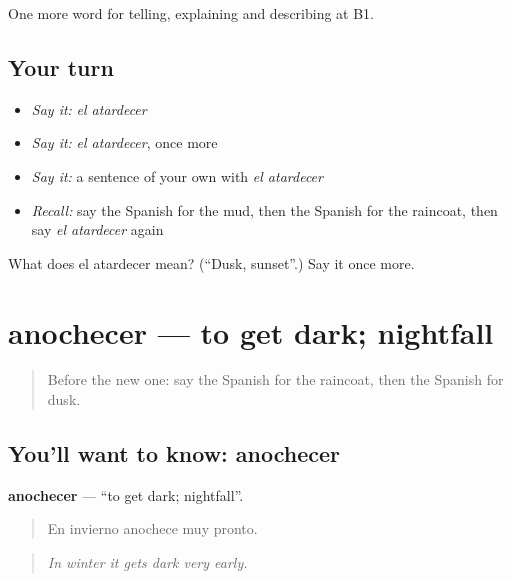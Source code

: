 \begin{grammarlens}[title={What you've built}]
One more word for telling, explaining and describing at B1.
\end{grammarlens}

\subsection*{Your turn}
\begin{itemize}
\raggedright
  \item \emph{Say it:} \emph{el atardecer}
  \item \emph{Say it:} \emph{el atardecer}, once more
  \item \emph{Say it:} a sentence of your own with \emph{el atardecer}
  \item \emph{Recall:} say the Spanish for the mud, then the Spanish for the raincoat, then say \emph{el atardecer} again
\end{itemize}

\begin{tcolorbox}[breakable,colback=teal!4,colframe=teal!35!black,title={Before you move on}]
What does el atardecer mean? (\textquotedblleft{}Dusk, sunset\textquotedblright{}.) Say it once more.
\end{tcolorbox}
\section[anochecer]{anochecer — to get dark; nightfall}

\label{lesson:ES-C703-anochecer}



\begin{quote}
Before the new one: say the Spanish for the raincoat, then the Spanish for dusk.
\end{quote}

\subsection*{You'll want to know: anochecer}
\textbf{anochecer} — \textquotedblleft{}to get dark; nightfall\textquotedblright{}.

\begin{quote}
En invierno anochece muy pronto.
\end{quote}

\begin{quote}
\emph{In winter it gets dark very early.}
\end{quote}

